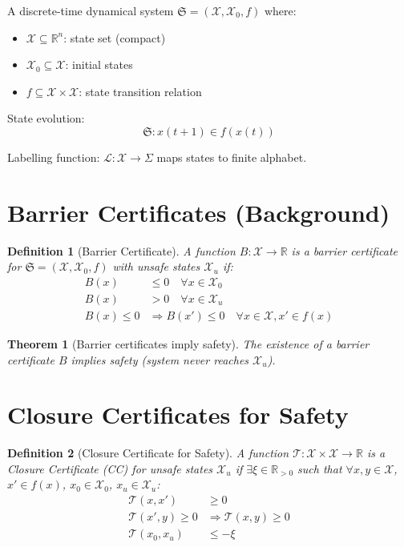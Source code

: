 \documentclass{article}
\newtheorem{definition}{Definition}
\newtheorem{theorem}{Theorem}
\begin{document}
A discrete-time dynamical system $\mathfrak{S} = (\mathcal{X}, \mathcal{X}_0, f)$ where:
\begin{itemize}
    \item $\mathcal{X} \subseteq \mathbb{R}^n$: state set (compact)
    \item $\mathcal{X}_0 \subseteq \mathcal{X}$: initial states
    \item $f \subseteq \mathcal{X} \times \mathcal{X}$: state transition relation
\end{itemize}

State evolution:
\begin{equation}
\mathfrak{S}: x(t+1) \in f(x(t))
\end{equation}

Labelling function: $\mathcal{L}: \mathcal{X} \rightarrow \Sigma$ maps states to finite alphabet.

\section{Barrier Certificates (Background)}

\begin{definition}[Barrier Certificate]
A function $B: \mathcal{X} \rightarrow \mathbb{R}$ is a barrier certificate for $\mathfrak{S} = (\mathcal{X}, \mathcal{X}_0, f)$ with unsafe states $\mathcal{X}_u$ if:
\begin{align}
B(x) &\leq 0 \quad \forall x \in \mathcal{X}_0 \label{bc1}\\
B(x) &> 0 \quad \forall x \in \mathcal{X}_u \label{bc2}\\
B(x) \leq 0 &\Rightarrow B(x') \leq 0 \quad \forall x \in \mathcal{X}, x' \in f(x) \label{bc3}
\end{align}
\end{definition}

\begin{theorem}[Barrier certificates imply safety]
The existence of a barrier certificate $B$ implies safety (system never reaches $\mathcal{X}_u$).
\end{theorem}

\section{Closure Certificates for Safety}

\begin{definition}[Closure Certificate for Safety]
A function $\mathcal{T}: \mathcal{X} \times \mathcal{X} \rightarrow \mathbb{R}$ is a Closure Certificate (CC) for unsafe states $\mathcal{X}_u$ if $\exists \xi \in \mathbb{R}_{>0}$ such that $\forall x, y \in \mathcal{X}$, $x' \in f(x)$, $x_0 \in \mathcal{X}_0$, $x_u \in \mathcal{X}_u$:
\begin{align}
\mathcal{T}(x, x') &\geq 0 \label{cc1}\\
\mathcal{T}(x', y) \geq 0 &\Rightarrow \mathcal{T}(x, y) \geq 0 \label{cc2}\\
\mathcal{T}(x_0, x_u) &\leq -\xi \label{cc3}
\end{align}
\end{definition}
\end{document}
